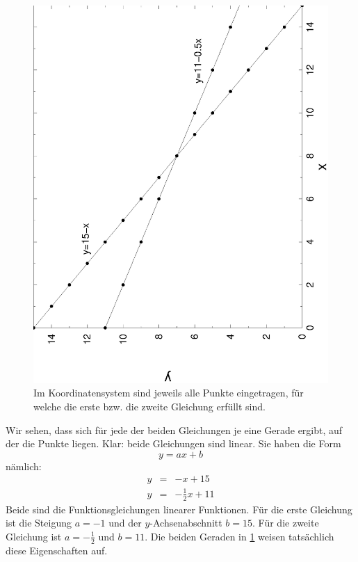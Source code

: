 \documentclass[%
11pt,%
twoside,%
titlepage,%
german,%
]{scrartcl}
\begin{document}
\begin{figure}[b!]
  \centering
  \includegraphics[angle=-90,width=\columnwidth]{pictures/augenbeine.eps}
  \caption{Im Koordinatensystem sind jeweils alle Punkte eingetragen, f\"ur welche die erste bzw. die zweite Gleichung erf\"ullt sind.}
  \label{fig:linglsyst:augenbeine}
\end{figure}

Wir sehen, dass sich f\"ur jede der beiden Gleichungen je eine Gerade ergibt, auf der die Punkte liegen. Klar: beide Gleichungen sind linear. Sie haben die Form
\begin{displaymath}
  y = ax + b
\end{displaymath}
n\"amlich:
\begin{eqnarray*}
  y & = & -x+15 \\
  y & = & -\frac{1}{2}x+11
\end{eqnarray*}
Beide sind die Funktionsgleichungen linearer Funktionen. F\"ur die erste Gleichung ist die Steigung $a=-1$ und der $y$-Achsenabschnitt $b=15$. F\"ur die zweite Gleichung ist $a=-\frac{1}{2}$ und $b=11$. Die beiden Geraden in \ref{fig:linglsyst:augenbeine} weisen tats\"achlich diese Eigenschaften auf.
\end{document}
